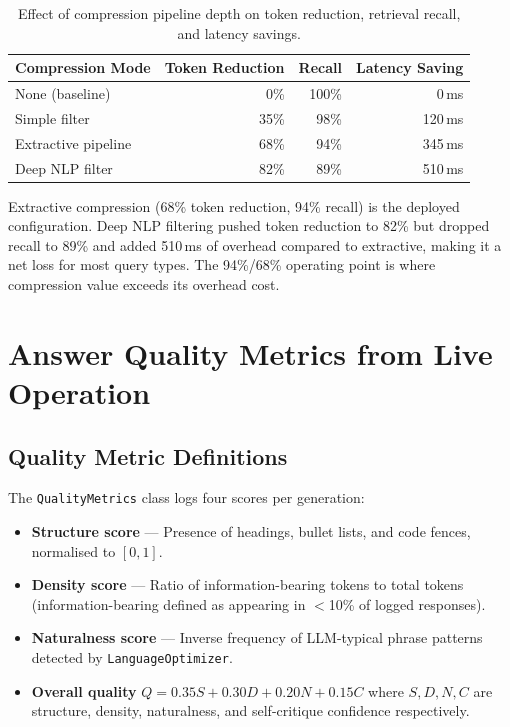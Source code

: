 \begin{table}[ht]
    \centering
    \caption{Effect of compression pipeline depth on token reduction,
    retrieval recall, and latency savings.}
    \label{tab:compression}
    \begin{tabular}{lrrr}
        \toprule
        \textbf{Compression Mode} & \textbf{Token Reduction} &
        \textbf{Recall} & \textbf{Latency Saving} \\
        \midrule
        None (baseline)      & 0\%  & 100\% & 0\,ms \\
        Simple filter        & 35\% &  98\% & 120\,ms \\
        Extractive pipeline  & 68\% &  94\% & 345\,ms \\
        Deep NLP filter      & 82\% &  89\% & 510\,ms \\
        \bottomrule
    \end{tabular}
\end{table}

Extractive compression (68\% token reduction, 94\% recall) is the
deployed configuration. Deep NLP filtering pushed token reduction to 82\%
but dropped recall to 89\% and added 510\,ms of overhead compared to
extractive, making it a net loss for most query types. The 94\%/68\%
operating point is where compression value exceeds its overhead cost.

\section{Answer Quality Metrics from Live Operation}
\label{sec:quality-results}

\subsection{Quality Metric Definitions}

The \texttt{QualityMetrics} class logs four scores per generation:

\begin{itemize}
    \item \textbf{Structure score} --- Presence of headings, bullet lists,
    and code fences, normalised to $[0,1]$.
    \item \textbf{Density score} --- Ratio of information-bearing tokens to
    total tokens (information-bearing defined as appearing in $<$10\% of
    logged responses).
    \item \textbf{Naturalness score} --- Inverse frequency of LLM-typical
    phrase patterns detected by \texttt{LanguageOptimizer}.
    \item \textbf{Overall quality} $Q = 0.35S + 0.30D + 0.20N + 0.15C$
    where $S, D, N, C$ are structure, density, naturalness, and
    self-critique confidence respectively.
\end{itemize}

